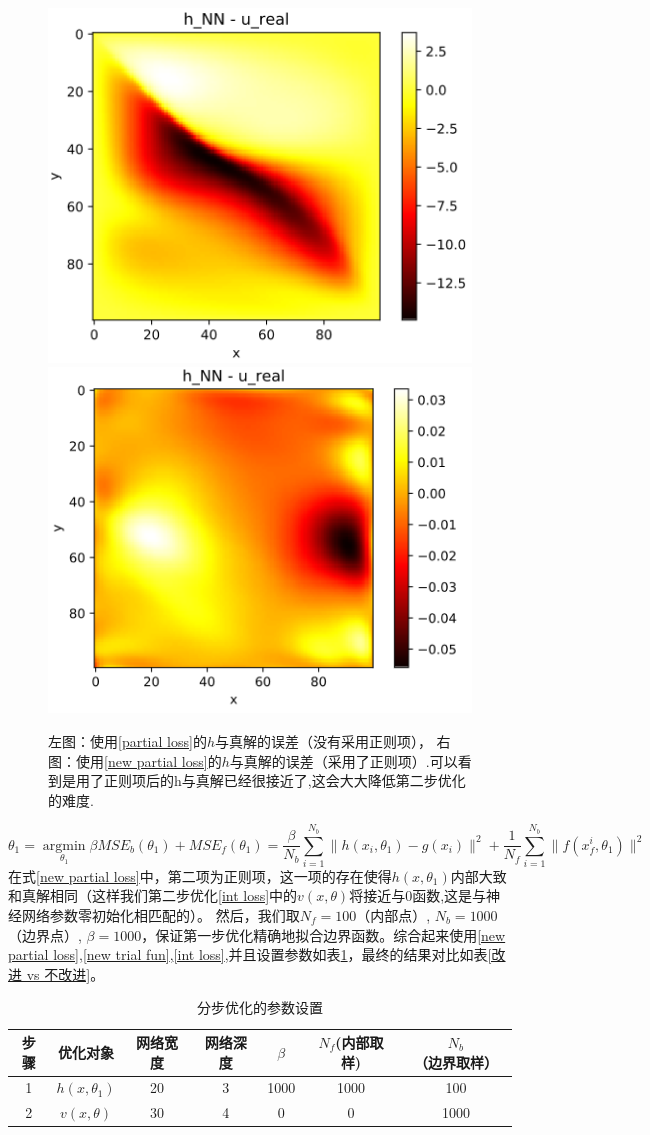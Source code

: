 \documentclass{article}
\begin{document}
\begin{figure}[ht]
\centering
\includegraphics[width=0.45\linewidth]{images/h_NN_old.png}
\includegraphics[width=0.45\linewidth]{images/h_NN_new.png}
\caption{左图：使用\ref{partial loss}的$h$与真解的误差（没有采用正则项）， 右图：使用\ref{new partial loss}的$h$与真解的误差（采用了正则项）.可以看到是用了正则项后的h与真解已经很接近了,这会大大降低第二步优化的难度.}
\label{h_NN}
\end{figure}
\begin{equation}\label{new partial loss}
\theta_1 = \mathop{argmin}\limits_{\theta_1} \beta MSE_b(\theta_1) + MSE_f(\theta_1)= \frac{\beta}{N_b}\sum_{i=1}^{N_b} \|h(x_i,\theta_1)-g(x_i)\|^2 + \frac{1}{N_f}\sum_{i=1}^{N_b} \|f(x_f^i,\theta_1)\|^2
\end{equation}
在式\ref{new partial loss}中，第二项为正则项，这一项的存在使得$h(x,\theta_1)$内部大致和真解相同（这样我们第二步优化\ref{int loss}中的$v(x,\theta)$将接近与0函数,这是与神经网络参数零初始化相匹配的）。 然后，我们取$N_f = 100$（内部点）, $N_b=1000$（边界点）, $\beta=1000$，保证第一步优化精确地拟合边界函数。综合起来使用\ref{new partial loss},\ref{new trial fun},\ref{int loss},并且设置参数如表\ref{参数配置}，最终的结果对比如表\ref{改进 vs 不改进}。
\begin{table}[ht]
\centering  
\caption{分步优化的参数设置}
\label{参数配置}
\begin{tabular}{ccccccc} 
	\toprule
	步骤 & 优化对象         & 网络宽度 &  网络深度 &   $\beta$ & $N_f$(内部取样) & $N_b$（边界取样）\\
	\hline
	1   &$h(x,\theta_1)$ & 20 &  3   & 1000 & 1000 & 100 \\
	\hline
	2   & $v(x,\theta)$   & 30 & 4  & 0   & 0     & 1000\\
	\hline
	\bottomrule
\end{tabular}
\end{table}
\end{document}
